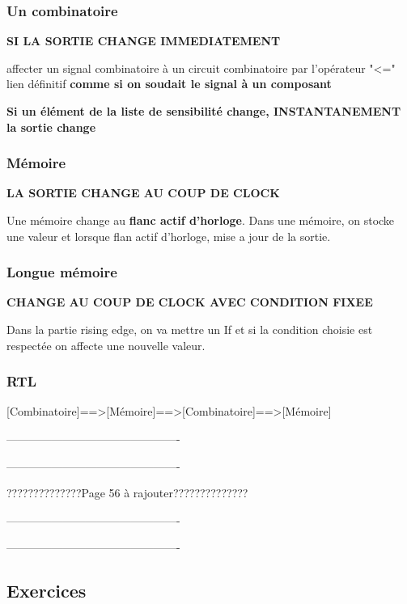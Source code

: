 \subsubsection{Un combinatoire}
\textbf{SI LA SORTIE CHANGE IMMEDIATEMENT}

affecter un signal combinatoire à un circuit combinatoire par l'opérateur "<=" lien définitif \textbf{comme si on soudait le signal à un composant}

\textbf{Si un élément de la liste de sensibilité change, INSTANTANEMENT la sortie change}

\subsubsection{Mémoire}
\textbf{LA SORTIE CHANGE AU COUP DE CLOCK}

Une mémoire change au \textbf{flanc actif d'horloge}. Dans une mémoire, on stocke une valeur et lorsque flan actif d'horloge, mise a jour de la sortie.

\subsubsection{Longue mémoire}
\textbf{CHANGE AU COUP DE CLOCK AVEC CONDITION FIXEE}

Dans la partie rising edge, on va mettre un If et si la condition choisie est respectée on affecte une nouvelle valeur.

\subsubsection{RTL}

[Combinatoire]==>[Mémoire]==>[Combinatoire]==>[Mémoire]

----------------------------------------------

----------------------------------------------

??????????????Page 56 à rajouter??????????????


----------------------------------------------

----------------------------------------------

\subsection{Exercices}











